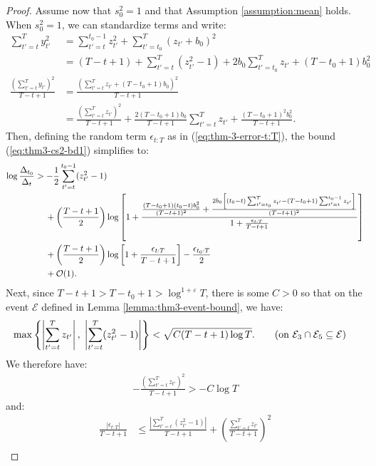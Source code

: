 \begin{proof}
Assume now that $s_0^2 = 1$ and that Assumption \ref{assumption:mean} holds. When $s_0^2 = 1$, we can standardize terms and write:
\begin{align*}
    \sum_{t'=t}^T y_{t'}^2  &= 
    \sum_{t'=t}^{t_0-1} z_{t'}^2 + \sum_{t'=t_0}^{T} (z_{t'} + b_0)^2  \\
    &= (T-t+1) + \sum_{t'=t}^T (z_{t'}^2 -1) + 2b_0 \sum_{t'=t_0}^{T} z_{t'} + (T-t_0+1)b_0^2  \\
    \frac{\left(\sum_{t'=t}^T y_{t'}\right)^2}{T-t+1} &= \frac{\left(\sum_{t'=t}^T z_{t'} + (T - t_0+1)b_0\right)^2}{T-t+1}  \\
    &= \frac{\left(\sum_{t'=t}^T z_{t'}\right)^2}{T-t+1} + \frac{2(T-t_0+1)b_0}{T-t+1} \sum_{t'=t}^T z_{t'} + \frac{(T-t_0+1)^2b_0^2}{T-t+1}. 
\end{align*}
Then, defining the random term $\epsilon_{t:T}$ as in (\ref{eq:thm-3-error-t:T}), the bound (\ref{eq:thm3-cs2-bd1}) simplifies to:
\begin{align}
    \log \frac{\Delta_{t_0}}{\Delta_t} &> - \frac{1}{2} \sum_{t' = t}^{t_0 - 1} (z_{t'}^2-1) \notag\\
    &\quad\: + \left(\frac{T - t +1}{2}\right)\log\left[1 +\frac{\frac{(T-t_0+1)(t_0-t)b_0^2}{(T-t+1)^2} + \frac{2b_0\left[(t_0-t)\sum_{t'=t_0}^{T} z_{t'} - (T-t_0+1)\sum_{t'=t}^{t_0-1} z_{t'}\right]}{(T-t+1)^2}}{1 + \frac{\epsilon_{t:T}}{T-t+1}} \right]\notag \\
    &\quad\: + \left(\frac{T - t +1}{2}\right)\log \left[1 + \frac{\epsilon_{t:T}}{T-t+1}\right]-\frac{\epsilon_{t_0:T}}{2} \notag\\
    &\quad\: + \mathcal{O}(1).\label{eq:thm3-cs2-bd5}
\end{align}
Next, since $T-t+1 > T-t_0+1>  \log^{1+\varepsilon} T$, there is some $C>0$ so that on the event $\mathcal{E}$ defined in Lemma \ref{lemma:thm3-event-bound}, we have:
\begin{align*}
    \max\left\{\left|\sum_{t'=t}^{T} z_{t'} \right|,\; \left|\sum_{t'=t}^{T} (z^2_{t'}-1)\right|\right\}&< \sqrt{C(T-t+1)\log T}. \tag{on $\mathcal{E}_3\cap\mathcal{E}_5 \subseteq \mathcal{E}$}
\end{align*}
We therefore have:
\begin{align*}
    - \frac{\left(\sum_{t'=t}^T z_{t'}\right)^2}{T-t+1} > - C\log T
\end{align*}
and: 
\begin{align*}
    \frac{|\epsilon_{t:T}|}{T-t+1} &\leq \frac{\left|\sum_{t'=t}^{T} (z^2_{t'}-1)\right|}{T-t+1} + \left(\frac{\sum_{t'=t}^{T} z_{t'}}{T-t+1} \right)^2 \\

\end{align*}
\end{proof}
